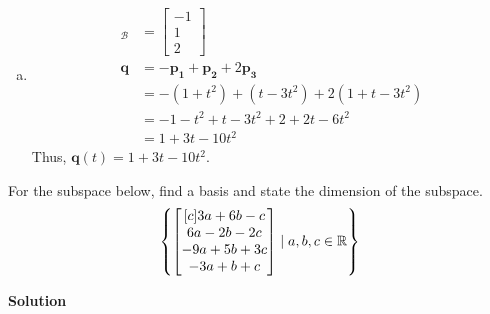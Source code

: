 \documentclass[11pt]{scrartcl}
\theoremstyle{dotlessP}
\theoremstyle{dotlessN}
\DeclarePairedDelimiter\set{\{}{\}}
\newcommand{\reals}{\mathbb{R}} %
\newcommand{\mb}[1]{\mathbf{#1}}
\newcommand{\basis}{\mathcal{B}}
\begin{document}
\begin{enumerate}[a)]
\begin{proof}
\begin{itemize}
\begin{align*}
\begin{bmatrix}[rrr|r]
					1 & 0 & 1 & 0 \\
					0 & 1 & 1 & 0\\
					0 & 0 & -1 & 0
				\end{bmatrix}
				\intertext{$\sim -R_3 \to R_3$.}
					\begin{bmatrix}[rrr|r]
					1 & 0 & 1 & 0 \\
					0 & 1 & 1 & 0\\
					0 & 0 & 1 & 0
				\end{bmatrix}
				\intertext{$R_2 - R_3 \to R_2, R_1 - R_3 \to R_1$.}
					\begin{bmatrix}[rrr|r]
					1 & 0 & 0 & 0 \\
					0 & 1 & 0 & 0\\
					0 & 0 & 1 & 0
				\end{bmatrix}
			\end{align*}
			Thus, as there only exists the trivial solution to the homogeneous system, the vectors are linearly independent.
		\item As $A$ has a pivot position in every row, the columns of $A$ span $\mathbb{P}_2$.
		\end{itemize}
		As $\basis$ satisfies both properties, the proof is complete.
	\end{proof}
\item 
	\begin{align*}
		[\mb{q}]_\basis &= 
\begin{bmatrix}
	-1 \\
	1 \\
	2
\end{bmatrix} \\
		\mb{q} &= -\mb{p_1} + \mb{p_2} + 2\mb{p_3} \\
			   &= -(1 + t^2) + (t - 3t^2) + 2(1 + t - 3t^2) \\
			   &= -1 - t^2 + t - 3t^2 + 2 + 2t - 6t^2 \\
			   &= 1 + 3t - 10t^2
		 	\end{align*}
			Thus, $\mb{q}(t) = 1 + 3t - 10t^2$.
\end{enumerate}
\begin{ques}
	For the subspace below, find a basis and state the dimension of the subspace.
	\[
		\set*{
			\begin{bmatrix}[c]
			3a + 6b - c \\
			6a - 2b - 2c \\
			-9a + 5b + 3c \\
			-3a + b + c 
		\end{bmatrix} \mid
		a,b,c \in \reals
		}
	\] 
\end{ques}
\textbf{Solution}
\end{document}
